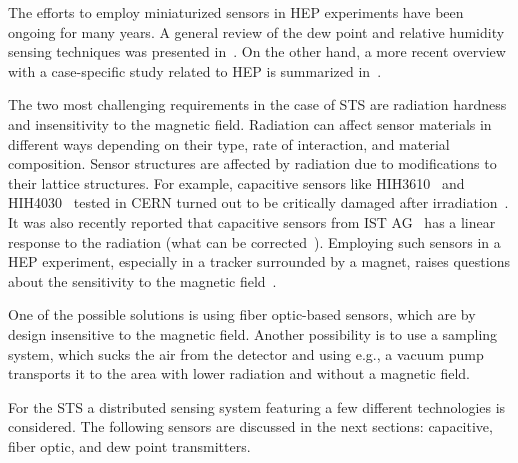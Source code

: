 The efforts to employ miniaturized sensors in \gls{HEP} experiments have been ongoing for many years. A general review of the dew point and relative humidity sensing techniques was presented in~\cite{RITTERSMA}. On the other hand, a more recent overview with a case-specific study related to \gls{HEP} is summarized in~\cite{Kapic}.

The two most challenging requirements in the case of \gls{STS} are radiation hardness and insensitivity to the magnetic field. Radiation can affect sensor materials in different ways depending on their type, rate of interaction, and material composition. Sensor structures are affected by radiation due to modifications to their lattice structures. For example, capacitive sensors like HIH3610~\cite{HIH3610} and HIH4030~\cite{HIH4030} tested in CERN turned out to be critically damaged after irradiation~\cite{Berruti}. It was also recently reported that capacitive sensors from IST AG~\cite{MK33} has a linear response to the radiation (what can be corrected~\cite{Kapic_sensor}). Employing such sensors in a \gls{HEP} experiment, especially in a tracker surrounded by a magnet, raises questions about the sensitivity to the magnetic field~\cite{Berruti}. 

One of the possible solutions is using fiber optic-based sensors, which are by design insensitive to the magnetic field. Another possibility is to use a sampling system, which sucks the air from the detector and using e.g., a vacuum pump transports it to the area with lower radiation and without a magnetic field.

For the \gls{STS} a distributed sensing system featuring a few different technologies is considered. The following sensors are discussed in the next sections: capacitive, fiber optic, and dew point transmitters. 


